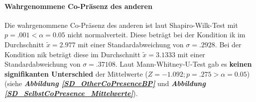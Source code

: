 \documentclass[a4paper,11pt]{article}%
\renewcommand{\\}{\vspace*{0.5\baselineskip} \newline}
\begin{document}
\paragraph{Wahrgenommene Co-Präsenz des anderen}
Die wahrgenommene Co-Präsenz des \dq{}anderen\dq{} ist laut Shapiro-Wilk-Test mit $p = .001 < \alpha = 0.05$ nicht normalverteit.
Diese beträgt bei der Kondition \ac{ik} im Durchschnitt $\tilde x = 2.977$ mit einer Standardabweichung von $\sigma = .2928$.
Bei der Kondition \ac{nik} beträgt diese im Durchschnitt $\tilde x =3.1333$ mit einer Standardabweichung von $\sigma =.37108$. 
Laut Mann-Whitney-U-Test gab es \textbf{keinen signifikanten Unterschied} der Mittelwerte ($ Z = -1.092; p = .275 > \alpha = 0.05$) (siehe \textbf{\textit{Abbildung \ref{SD_OtherCoPresenceBP}}} und \textbf{\textit{Abbildung \ref{SD_SelbstCoPresence_Mittelwerte}}}).
\end{document}
